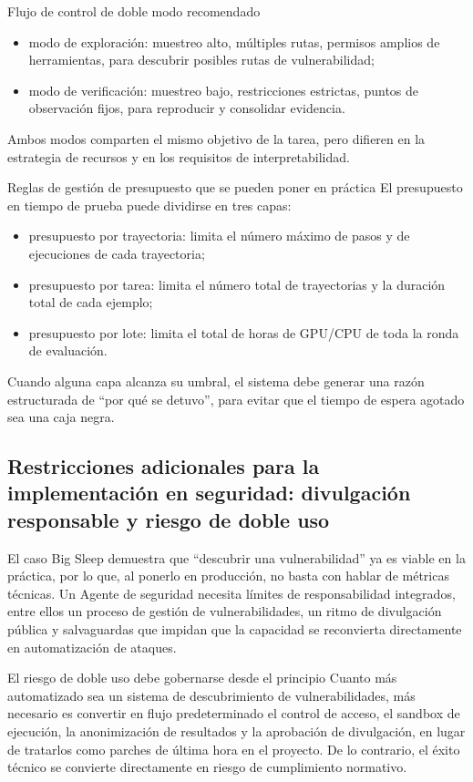 \documentclass[a4paper]{article}
\begin{document}
\begin{importantbox}{Flujo de control de doble modo recomendado}
\begin{itemize}
    \item modo de exploración: muestreo alto, múltiples rutas, permisos amplios de herramientas, para descubrir posibles rutas de vulnerabilidad;
    \item modo de verificación: muestreo bajo, restricciones estrictas, puntos de observación fijos, para reproducir y consolidar evidencia.
\end{itemize}
Ambos modos comparten el mismo objetivo de la tarea, pero difieren en la estrategia de recursos y en los requisitos de interpretabilidad.
\end{importantbox}

\begin{knowledgebox}{Reglas de gestión de presupuesto que se pueden poner en práctica}
El presupuesto en tiempo de prueba puede dividirse en tres capas:
\begin{itemize}
    \item presupuesto por trayectoria: limita el número máximo de pasos y de ejecuciones de cada trayectoria;
    \item presupuesto por tarea: limita el número total de trayectorias y la duración total de cada ejemplo;
    \item presupuesto por lote: limita el total de horas de GPU/CPU de toda la ronda de evaluación.
\end{itemize}
Cuando alguna capa alcanza su umbral, el sistema debe generar una razón estructurada de ``por qué se detuvo'', para evitar que el tiempo de espera agotado sea una caja negra.
\end{knowledgebox}

\subsection{Restricciones adicionales para la implementación en seguridad: divulgación responsable y riesgo de doble uso}
El caso Big Sleep demuestra que ``descubrir una vulnerabilidad'' ya es viable en la práctica, por lo que, al ponerlo en producción, no basta con hablar de métricas técnicas. Un Agente de seguridad necesita límites de responsabilidad integrados, entre ellos un proceso de gestión de vulnerabilidades, un ritmo de divulgación pública y salvaguardas que impidan que la capacidad se reconvierta directamente en automatización de ataques.

\begin{warningbox}{El riesgo de doble uso debe gobernarse desde el principio}
Cuanto más automatizado sea un sistema de descubrimiento de vulnerabilidades, más necesario es convertir en flujo predeterminado el control de acceso, el sandbox de ejecución, la anonimización de resultados y la aprobación de divulgación, en lugar de tratarlos como parches de última hora en el proyecto. De lo contrario, el éxito técnico se convierte directamente en riesgo de cumplimiento normativo.
\end{warningbox}
\end{document}
